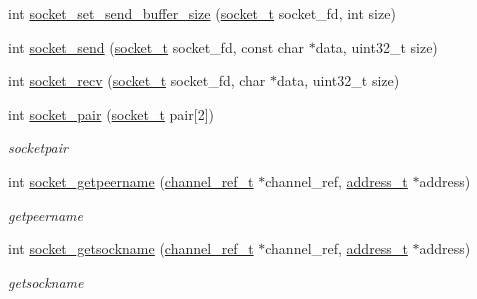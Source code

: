 \begin{DoxyCompactItemize}
\item 
int \hyperlink{a00073_a8489cd06398f759fff9660006dc8c10d_a8489cd06398f759fff9660006dc8c10d}{socket\+\_\+set\+\_\+send\+\_\+buffer\+\_\+size} (\hyperlink{a00047_a0d9e0afbf02fb6ed6c5b1415dce51b05_a0d9e0afbf02fb6ed6c5b1415dce51b05}{socket\+\_\+t} socket\+\_\+fd, int size)
\item 
int \hyperlink{a00073_a1acbefba637d7c0c3fd77355f84d4c22_a1acbefba637d7c0c3fd77355f84d4c22}{socket\+\_\+send} (\hyperlink{a00047_a0d9e0afbf02fb6ed6c5b1415dce51b05_a0d9e0afbf02fb6ed6c5b1415dce51b05}{socket\+\_\+t} socket\+\_\+fd, const char $\ast$data, uint32\+\_\+t size)
\item 
int \hyperlink{a00073_a8a4b901f1586de59d1d0a88d3326c934_a8a4b901f1586de59d1d0a88d3326c934}{socket\+\_\+recv} (\hyperlink{a00047_a0d9e0afbf02fb6ed6c5b1415dce51b05_a0d9e0afbf02fb6ed6c5b1415dce51b05}{socket\+\_\+t} socket\+\_\+fd, char $\ast$data, uint32\+\_\+t size)
\item 
int \hyperlink{a00073_a64d681185ca861b010c81db7479e9e08_a64d681185ca861b010c81db7479e9e08}{socket\+\_\+pair} (\hyperlink{a00047_a0d9e0afbf02fb6ed6c5b1415dce51b05_a0d9e0afbf02fb6ed6c5b1415dce51b05}{socket\+\_\+t} pair\mbox{[}2\mbox{]})
\begin{DoxyCompactList}\small\item\em socketpair \end{DoxyCompactList}\item 
int \hyperlink{a00073_af9dec30d9e18787252fecc0de537843f_af9dec30d9e18787252fecc0de537843f}{socket\+\_\+getpeername} (\hyperlink{a00047_a151271c9d188ef28d4d24bb81dcc1263_a151271c9d188ef28d4d24bb81dcc1263}{channel\+\_\+ref\+\_\+t} $\ast$channel\+\_\+ref, \hyperlink{a00047_a7a6e75b85c8b441f843bd40004a7d9d5_a7a6e75b85c8b441f843bd40004a7d9d5}{address\+\_\+t} $\ast$address)
\begin{DoxyCompactList}\small\item\em getpeername \end{DoxyCompactList}\item 
int \hyperlink{a00073_ad427473485df55e150741186f3ef2879_ad427473485df55e150741186f3ef2879}{socket\+\_\+getsockname} (\hyperlink{a00047_a151271c9d188ef28d4d24bb81dcc1263_a151271c9d188ef28d4d24bb81dcc1263}{channel\+\_\+ref\+\_\+t} $\ast$channel\+\_\+ref, \hyperlink{a00047_a7a6e75b85c8b441f843bd40004a7d9d5_a7a6e75b85c8b441f843bd40004a7d9d5}{address\+\_\+t} $\ast$address)
\begin{DoxyCompactList}\small\item\em getsockname \end{DoxyCompactList}\item 

\end{DoxyCompactItemize}
